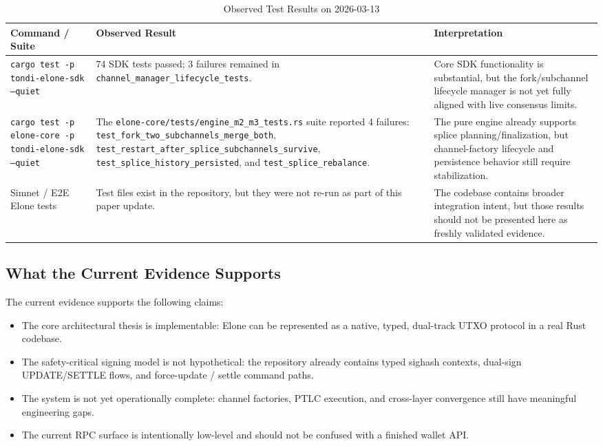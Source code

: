 \begin{table}[htbp]
\centering
\caption{Observed Test Results on 2026-03-13}
\label{tab:test_results_current}
\footnotesize
\begin{tabularx}{\linewidth}{@{}X X X@{}}
\toprule
\textbf{Command / Suite} & \textbf{Observed Result} & \textbf{Interpretation} \\
\midrule
\texttt{cargo test -p tondi-elone-sdk --quiet} & 74 SDK tests passed; 3 failures remained in \texttt{channel\_manager\_lifecycle\_tests}. & Core SDK functionality is substantial, but the fork/subchannel lifecycle manager is not yet fully aligned with live consensus limits. \\
\midrule
\texttt{cargo test -p elone-core -p tondi-elone-sdk --quiet} & The \texttt{elone-core/tests/engine\_m2\_m3\_tests.rs} suite reported 4 failures: \texttt{test\_fork\_two\_subchannels\_merge\_both}, \texttt{test\_restart\_after\_splice\_subchannels\_survive}, \texttt{test\_splice\_history\_persisted}, and \texttt{test\_splice\_rebalance}. & The pure engine already supports splice planning/finalization, but channel-factory lifecycle and persistence behavior still require stabilization. \\
\midrule
Simnet / E2E Elone tests & Test files exist in the repository, but they were not re-run as part of this paper update. & The codebase contains broader integration intent, but those results should not be presented here as freshly validated evidence. \\
\bottomrule
\end{tabularx}
\end{table}

\subsection{What the Current Evidence Supports}

The current evidence supports the following claims:
\begin{itemize}
    \item The core architectural thesis is implementable: Elone can be represented as a native, typed, dual-track UTXO protocol in a real Rust codebase.
    \item The safety-critical signing model is not hypothetical: the repository already contains typed sighash contexts, dual-sign UPDATE/SETTLE flows, and force-update / settle command paths.
    \item The system is not yet operationally complete: channel factories, PTLC execution, and cross-layer convergence still have meaningful engineering gaps.
    \item The current RPC surface is intentionally low-level and should not be confused with a finished wallet API.
\end{itemize}

